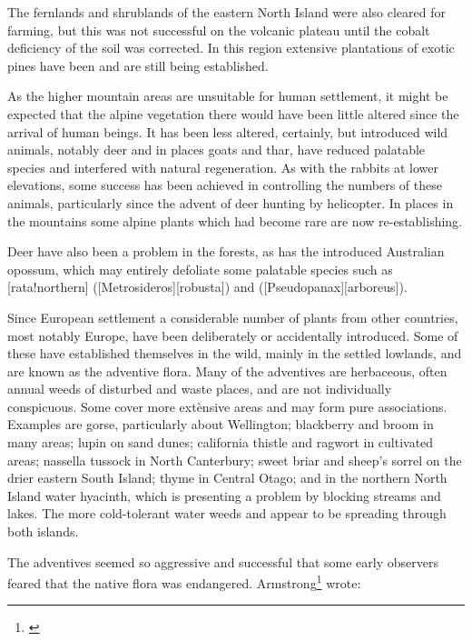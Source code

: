 The fernlands and shrublands of the eastern North Island were also cleared for farming, but this was not successful on the volcanic plateau until the cobalt deficiency of the soil was corrected.
In this region extensive plantations of exotic pines have been and are still being established.

As the higher mountain areas are unsuitable for human settlement, it might be expected that the alpine vegetation there would have been little altered since the arrival of human beings.
It has been less altered, certainly, but introduced wild animals, notably deer and in places goats and thar, have reduced palatable species and interfered with natural regeneration.
As with the rabbits at lower elevations, some success has been achieved in controlling the numbers of these animals, particularly since the advent of deer hunting by helicopter.
In places in the mountains some alpine plants which had become rare are now re-establishing.

Deer have also been a problem in the forests, as has the introduced Australian opossum, which may entirely defoliate some palatable species such as [rata!northern] ([Metrosideros][robusta]) and  ([Pseudopanax][arboreus]).

Since European settlement a considerable number of plants from other countries, most notably Europe, have been deliberately or accidentally introduced.
Some of these have established themselves in the wild, mainly in the settled lowlands, and are known as the adventive flora.
Many of the adventives are herbaceous, often annual weeds of disturbed and waste places, and are not individually conspicuous.
Some cover more extènsive areas and may form pure associations.
Examples are gorse, particularly about Wellington; blackberry and broom in many areas; lupin on sand dunes; california thistle and ragwort in cultivated areas; nassella tussock in North Canterbury; sweet briar and sheep's sorrel on the drier eastern South Island; thyme in Central Otago; and in the northern North Island water hyacinth, which is presenting a problem by blocking streams and lakes.
The more cold-tolerant water weeds  and  appear to be spreading through both islands.

The adventives seemed so aggressive and successful that some early observers feared that the native flora was endangered.
Armstrong\footnote{\cite{armstrong1872naturalised}} wrote:

